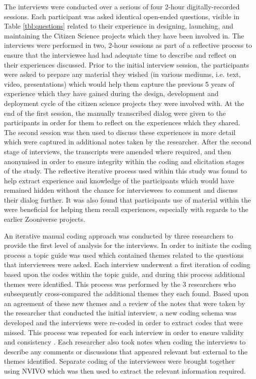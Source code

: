 \documentclass{sigchi}
\begin{document}
The interviews were conducted over a serious of four 2-hour digitally-recorded sessions. Each participant was asked identical open-ended questions, visible in Table \ref{tbl:questions} related to their experience in designing, launching, and maintaining the Citizen Science projects which they have been involved in. The interviews were performed in two, 2-hour sessions as part of a reflective process to ensure that the interviewee had had adequate time to describe and reflect on their experiences discussed. Prior to the initial interview session, the participants were asked to prepare any material they wished (in various mediums, i.e. text, video, presentations) which would help them capture the previous 5 years of experience which they have gained during the design, development and deployment cycle of the citizen science projects they were involved with. At the end of the first session, the manually transcribed dialog were given to the participants in order for them to reflect on the experiences which they shared. The second session was then used to discuss these experiences in more detail which were captured in additional notes taken by the researcher. After the second stage of interviews, the transcripts were amended where required, and then anonymised in order to ensure integrity within the coding and elicitation stages of the study. The reflective iterative process used within this study was found to help extract experience and knowledge of the participants which would have remained hidden without the chance for interviewees to comment and discuss their dialog further. It was also found that participants use of material within the were beneficial for helping them recall experiences, especially with regards to the earlier Zooniverse projects.

An iterative manual coding approach was conducted by three researchers to provide the first level of analysis for the interviews. In order to initiate the coding process a topic guide was used which contained themes related to the questions that interviewees were asked. Each interview underwent a first iteration of coding based upon the codes within the topic guide, and during this process additional themes were identified. This process was performed by the 3 researchers who subsequently cross-compared the additional themes they each found. Based upon an agreement of these new themes and a review of the notes that were taken by the researcher that conducted the initial interview, a new coding schema was developed and the interviews were re-coded in order to extract codes that were missed. This process was repeated for each interview in order to ensure validity and consistency \cite{Strauss1987} \cite{Lafaille1995}. Each researcher also took notes when coding the interviews to describe any comments or discussions that appeared relevant but external to the themes identified. Separate coding of the interviewees were brought together using NVIVO which was then used to extract the relevant information required.
\end{document}
